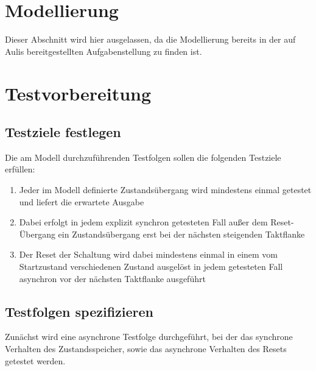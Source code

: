 \documentclass[a4paper,12pt,bibtotocnumbered]{scrartcl} %
\numberwithin{equation}{section} %
\begin{document}
\section{Modellierung}

Dieser Abschnitt wird hier ausgelassen, da die Modellierung bereits in der auf Aulis bereitgestellten Aufgabenstellung zu finden ist.

\section{Testvorbereitung}
\subsection{Testziele festlegen}
Die am Modell durchzuführenden Testfolgen sollen die folgenden Testziele erfüllen:
\begin{enumerate}
	\item{Jeder im Modell definierte Zustandsübergang wird mindestens einmal getestet und liefert die erwartete Ausgabe}
	\item{Dabei erfolgt in jedem explizit synchron getesteten Fall außer dem Reset-Übergang ein Zustandsübergang erst bei der nächsten steigenden Taktflanke}
	\item{Der Reset der Schaltung wird dabei mindestens einmal in einem vom Startzustand verschiedenen Zustand ausgelöst in jedem getesteten Fall asynchron vor der nächsten Taktflanke ausgeführt}
\end{enumerate}

\newpage
\subsection{Testfolgen spezifizieren}

Zunächst wird eine asynchrone Testfolge durchgeführt, bei der das synchrone Verhalten des Zustandsspeicher, sowie das asynchrone Verhalten des Resets getestet werden.
\end{document}
